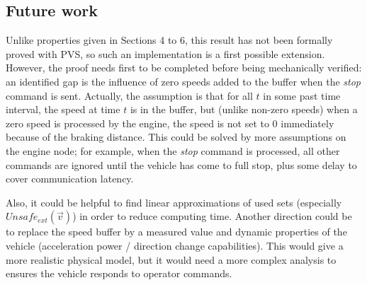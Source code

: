 \subsection{Future work}

Unlike properties given in Sections 4 to 6, this result has not been formally proved with PVS, so such an implementation is a first possible extension.
However, the proof needs first to be completed before being mechanically verified: an identified gap is the influence of zero speeds added to the buffer when the \emph{stop} command is sent.
Actually, the assumption is that for all $t$ in some past time interval, the speed at time $t$ is in the buffer, but (unlike non-zero speeds) when a zero speed is processed by the engine, the speed is not set to 0 immediately because of the braking distance.
This could be solved by more assumptions on the engine node; for example, when the \emph{stop} command is processed, all other commands are ignored until the vehicle has come to full stop, plus some delay to cover communication latency.

Also, it could be helpful to find linear approximations of used sets (especially $Unsafe_{ext}(\vec{v})$) in order to reduce computing time. 
Another direction could be to replace the speed buffer by a measured value and dynamic properties of the vehicle (acceleration power / direction change capabilities).
This would give a more realistic physical model, but it would need a more complex analysis to ensures the vehicle responds to operator commands.







